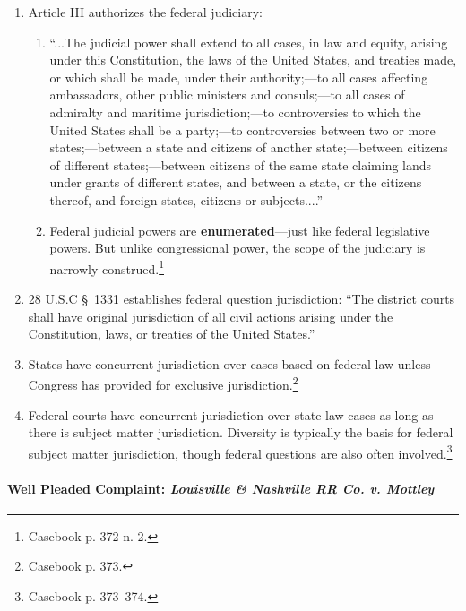 \begin{enumerate}
    \item Article III authorizes the federal judiciary:
    \begin{enumerate}
        \item ``...The judicial power shall extend to all cases, in law and equity, arising under this Constitution, the laws of the United States, and treaties made, or which shall be made, under their authority;---to all cases affecting ambassadors, other public ministers and consuls;---to all cases of admiralty and maritime jurisdiction;---to controversies to which the United States shall be a party;---to controversies between two or more states;---between a state and citizens of another state;---between citizens of different states;---between citizens of the same state claiming lands under grants of different states, and between a state, or the citizens thereof, and foreign states, citizens or subjects....''
        \item Federal judicial powers are \textbf{enumerated}---just like federal legislative powers. But unlike congressional power, the scope of the judiciary is narrowly construed.\footnote{Casebook p. 372 n. 2.}
    \end{enumerate}
    \item 28 U.S.C \S\ 1331 establishes federal question jurisdiction: ``The district courts shall have original jurisdiction of all civil actions arising under the Constitution, laws, or treaties of the United States.''
    \item States have concurrent jurisdiction over cases based on federal law unless Congress has provided for exclusive jurisdiction.\footnote{Casebook p. 373.}
    \item Federal courts have concurrent jurisdiction over state law cases as long as there is subject matter jurisdiction. Diversity is typically the basis for federal subject matter jurisdiction, though federal questions are also often involved.\footnote{Casebook p. 373--374.}
\end{enumerate}

\paragraph{Well Pleaded Complaint: \emph{Louisville \& Nashville RR Co. v. Mottley}}

